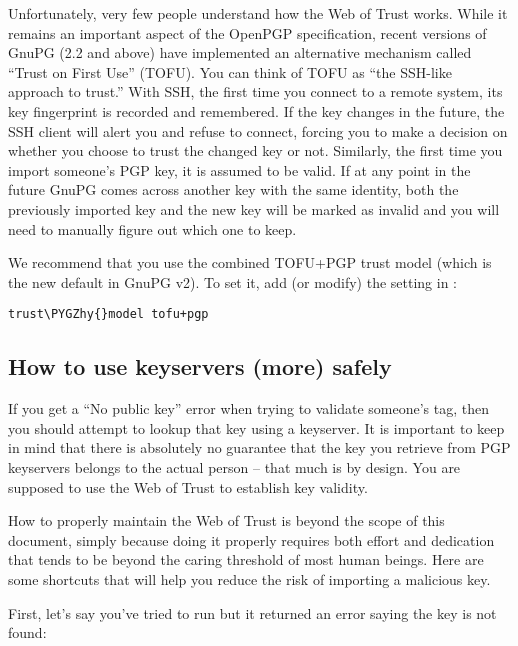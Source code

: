 \documentclass[a4paper,8pt,english]{sphinxmanual}
\def\PYGZhy{\char`\-}
\begin{document}
Unfortunately, very few people understand how the Web of Trust works.
While it remains an important aspect of the OpenPGP specification,
recent versions of GnuPG (2.2 and above) have implemented an alternative
mechanism called ``Trust on First Use'' (TOFU). You can think of TOFU as
``the SSH-like approach to trust.'' With SSH, the first time you connect
to a remote system, its key fingerprint is recorded and remembered. If
the key changes in the future, the SSH client will alert you and refuse
to connect, forcing you to make a decision on whether you choose to
trust the changed key or not. Similarly, the first time you import
someone's PGP key, it is assumed to be valid. If at any point in the
future GnuPG comes across another key with the same identity, both the
previously imported key and the new key will be marked as invalid and
you will need to manually figure out which one to keep.

We recommend that you use the combined TOFU+PGP trust model (which is
the new default in GnuPG v2). To set it, add (or modify) the
 setting in :

\begin{Verbatim}[commandchars=\\\{\}]
trust\PYGZhy{}model tofu+pgp
\end{Verbatim}


\subsection{How to use keyservers (more) safely}
\label{process/maintainer-pgp-guide:how-to-use-keyservers-more-safely}
If you get a ``No public key'' error when trying to validate someone's
tag, then you should attempt to lookup that key using a keyserver. It is
important to keep in mind that there is absolutely no guarantee that the
key you retrieve from PGP keyservers belongs to the actual person --
that much is by design. You are supposed to use the Web of Trust to
establish key validity.

How to properly maintain the Web of Trust is beyond the scope of this
document, simply because doing it properly requires both effort and
dedication that tends to be beyond the caring threshold of most human
beings. Here are some shortcuts that will help you reduce the risk of
importing a malicious key.

First, let's say you've tried to run  but it returned
an error saying the key is not found:
\end{document}
